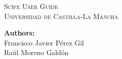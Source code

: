 \documentclass[11pt]{article}
\begin{document}
\thispagestyle{empty}
\begin{titlepage}
	\begin{center}
		\textsc{\Huge Scife User Guide}
		\vspace*{0.5in}\\
		\huge{\textsc{Universidad de Castilla-La Mancha}}
		\vspace*{0.6in}\\
		\begin{figure}[h!]
			\centering
			\hspace{.5cm}
		\end{figure}
		\vspace{0.6in}
		\huge{\textbf{Authors:}\\Francisco Javier Pérez Gil\\Raúl Moreno Galdón}
	\end{center}
\end{titlepage}
\end{document}

